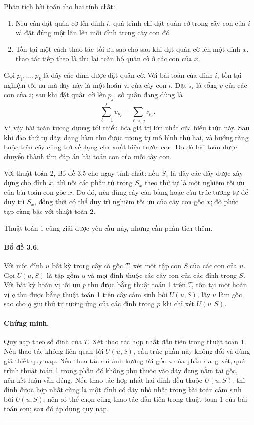 \documentclass[11pt]{article}
\begin{document}
Phân tích bài toán cho hai tính chất:
\begin{enumerate}
  \item Nếu cần đặt quân cờ lên đỉnh $i$, quá trình chỉ đặt quân cờ trong cây
  con của $i$ và đặt đúng một lần lên mỗi đỉnh trong cây con đó.
  \item Tồn tại một cách thao tác tối ưu sao cho sau khi đặt quân cờ lên một
  đỉnh $x$, thao tác tiếp theo là thu lại toàn bộ quân cờ ở các con của $x$.
\end{enumerate}
Gọi $p_1,\ldots,p_k$ là dãy các đỉnh được đặt quân cờ. Với bài toán của đỉnh
$i$, tồn tại nghiệm tối ưu mà dãy này là một hoán vị của cây con $i$. Đặt
$s_i$ là tổng $v$ của các con của $i$; sau khi đặt quân cờ lên $p_j$, số quân
đang dùng là
\[
  \sum_{\ell=1}^j v_{p_\ell}-\sum_{\ell<j}s_{p_\ell}.
\]
Vì vậy bài toán tương đương tối thiểu hóa giá trị lớn nhất của biểu thức này.
Sau khi đảo thứ tự dãy, dạng hàm thu được tương tự mô hình thứ hai, và hướng
ràng buộc trên cây cũng trở về dạng cha xuất hiện trước con. Do đó bài toán
được chuyển thành tìm đáp án bài toán con của mỗi cây con.

Với thuật toán 2, Bổ đề 3.5 cho ngay tính chất: nếu $S_x$ là dãy các dãy được
xây dựng cho đỉnh $x$, thì nối các phần tử trong $S_x$ theo thứ tự là một nghiệm
tối ưu của bài toán con gốc $x$. Do đó, nếu dùng cây cân bằng hoặc cấu trúc
tương tự để duy trì $S_x$, đồng thời có thể duy trì nghiệm tối ưu của cây con
gốc $x$; độ phức tạp cùng bậc với thuật toán 2.

Thuật toán 1 cũng giải được yêu cầu này, nhưng cần phân tích thêm.

\paragraph{Bổ đề 3.6.}
Với một đỉnh $u$ bất kỳ trong cây có gốc $T$, xét một tập con $S$ của các con
của $u$. Gọi $U(u,S)$ là tập gồm $u$ và mọi đỉnh thuộc các cây con của các đỉnh
trong $S$. Với bất kỳ hoán vị tối ưu $p$ thu được bằng thuật toán 1 trên $T$,
tồn tại một hoán vị $q$ thu được bằng thuật toán 1 trên cây cảm sinh bởi
$U(u,S)$, lấy $u$ làm gốc, sao cho $q$ giữ thứ tự tương ứng của các đỉnh trong
$p$ khi chỉ xét $U(u,S)$.

\paragraph{Chứng minh.}
Quy nạp theo số đỉnh của $T$. Xét thao tác hợp nhất đầu tiên trong thuật toán 1.
Nếu thao tác không liên quan tới $U(u,S)$, cấu trúc phần này không đổi và dùng
giả thiết quy nạp. Nếu thao tác chỉ ảnh hưởng tới gốc $u$ của phần đang xét,
quá trình thuật toán 1 trong phần đó không phụ thuộc vào dãy đang nằm tại gốc,
nên kết luận vẫn đúng. Nếu thao tác hợp nhất hai đỉnh đều thuộc $U(u,S)$, thì
đỉnh được hợp nhất cũng là một đỉnh có dãy nhỏ nhất trong bài toán cảm sinh bởi
$U(u,S)$, nên có thể chọn cùng thao tác đầu tiên trong thuật toán 1 của bài toán
con; sau đó áp dụng quy nạp. \hfill\rule{0.55em}{0.55em}
\end{document}
